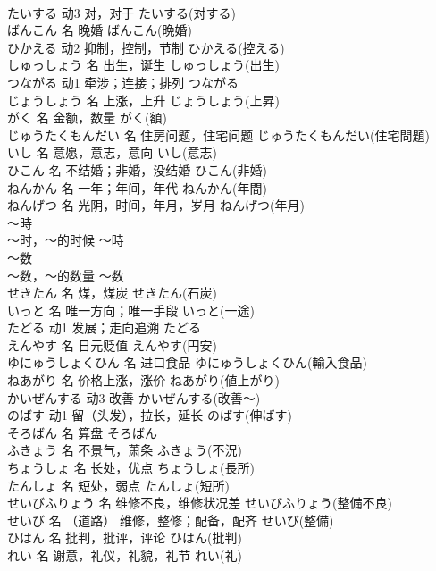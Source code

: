 \documentclass[8pt]{extreport}
\begin{document}
\begin{CJK}{UTF8}{min}
\\	たいする	动3	对，对于	たいする(対する)	
\\	ばんこん	名	晚婚	ばんこん(晩婚)	
\\	ひかえる	动2	抑制，控制，节制	ひかえる(控える)	
\\	しゅっしょう	名	出生，诞生	しゅっしょう(出生)	
\\	つながる	动1	牵涉；连接；排列	つながる	
\\	じょうしょう	名	上涨，上升	じょうしょう(上昇)	
\\	がく	名	金额，数量	がく(額)	
\\	じゅうたくもんだい	名	住房问题，住宅问题	じゅうたくもんだい(住宅問題)	
\\	いし	名	意愿，意志，意向	いし(意志)	
\\	ひこん	名	不结婚；非婚，没结婚	ひこん(非婚)	
\\	ねんかん	名	一年；年间，年代	ねんかん(年間)	
\\	ねんげつ	名	光阴，时间，年月，岁月	ねんげつ(年月)	
\\	～時	
\\	～时，～的时候	～時	
\\	～数	
\\	～数，～的数量	～数	
\\	せきたん	名	煤，煤炭	せきたん(石炭)	
\\	いっと	名	唯一方向；唯一手段	いっと(一途)	
\\	たどる	动1	发展；走向追溯	たどる	
\\	えんやす	名	日元贬值	えんやす(円安)	
\\	ゆにゅうしょくひん	名	进口食品	ゆにゅうしょくひん(輸入食品)	
\\	ねあがり	名	价格上涨，涨价	ねあがり(値上がり)	
\\	かいぜんする	动3	改善	かいぜんする(改善～)	
\\	のばす	动1	留（头发），拉长，延长	のばす(伸ばす)	
\\	そろばん	名	算盘	そろばん	
\\	ふきょう	名	不景气，萧条	ふきょう(不況)	
\\	ちょうしょ	名	长处，优点	ちょうしょ(長所)	
\\	たんしょ	名	短处，弱点	たんしょ(短所)	
\\	せいびふりょう	名	维修不良，维修状况差	せいびふりょう(整備不良)	
\\	せいび	名	（道路） 维修，整修；配备，配齐	せいび(整備)	
\\	ひはん	名	批判，批评，评论	ひはん(批判)	
\\	れい	名	谢意，礼仪，礼貌，礼节	れい(礼)	

\end{CJK}
\end{document}
